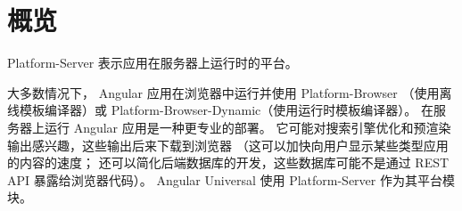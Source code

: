 \section{概览}


Platform-Server 表示应用在服务器上运行时的平台。


大多数情况下，
Angular 应用在浏览器中运行并使用 Platform-Browser
（使用离线模板编译器）或 Platform-Browser-Dynamic（使用运行时模板编译器）。
在服务器上运行 Angular 应用是一种更专业的部署。
它可能对搜索引擎优化和预渲染输出感兴趣，这些输出后来下载到浏览器
（这可以加快向用户显示某些类型应用的内容的速度；
还可以简化后端数据库的开发，这些数据库可能不是通过 REST API 暴露给浏览器代码）。
Angular Universal 使用 Platform-Server 作为其平台模块。


